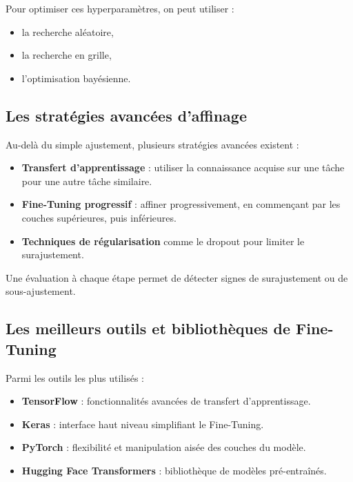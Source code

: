 Pour optimiser ces hyperparamètres, on peut utiliser :
\begin{itemize}
	\item la recherche aléatoire,

	\item la recherche en grille,

	\item l’optimisation bayésienne.
\end{itemize}

\subsection*{Les stratégies avancées d’affinage}
Au-delà du simple ajustement, plusieurs stratégies avancées existent :
\begin{itemize}
	\item \textbf{Transfert d’apprentissage} : utiliser la connaissance acquise
		sur une tâche pour une autre tâche similaire.

	\item \textbf{Fine-Tuning progressif} : affiner progressivement, en commençant
		par les couches supérieures, puis inférieures.

	\item \textbf{Techniques de régularisation} comme le dropout pour limiter le
		surajustement.
\end{itemize}

Une évaluation à chaque étape permet de détecter signes de surajustement ou de sous-ajustement.

\subsection*{Les meilleurs outils et bibliothèques de Fine-Tuning}
Parmi les outils les plus utilisés :
\begin{itemize}
	\item \textbf{TensorFlow} : fonctionnalités avancées de transfert
		d’apprentissage.

	\item \textbf{Keras} : interface haut niveau simplifiant le Fine-Tuning.

	\item \textbf{PyTorch} : flexibilité et manipulation aisée des couches du
		modèle.

	\item \textbf{Hugging Face Transformers} : bibliothèque de modèles pré-entraînés.
\end{itemize}

